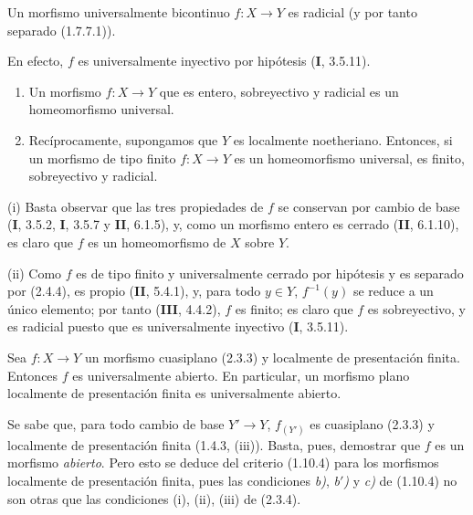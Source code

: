 \begin{proposition}[2.4.4]
\label{IV.2.4.4-fr}
Un morfismo universalmente bicontinuo $f:X\to Y$ es radicial (y por tanto
separado \textup{(1.7.7.1)}).
\end{proposition}

En efecto, $f$ es universalmente inyectivo por hipótesis (\textbf I, 3.5.11).

\begin{proposition}[2.4.5]
\begin{enumerate}
\item[\textup{(i)}] Un morfismo $f:X\to Y$ que es entero, sobreyectivo y radicial es un
homeomorfismo universal.
\item[\textup{(ii)}] Recíprocamente, supongamos que $Y$ es localmente noetheriano.
Entonces, si un morfismo de tipo finito $f:X\to Y$ es un homeomorfismo
universal, es finito, sobreyectivo y radicial.
\end{enumerate}
\end{proposition}

(i) Basta observar que las tres propiedades de $f$ se conservan por cambio de
base (\textbf I, 3.5.2, \textbf{I}, 3.5.7 y \textbf{II}, 6.1.5), y, como un morfismo entero es cerrado
(\textbf{II}, 6.1.10), es claro que $f$ es un homeomorfismo de $X$ sobre $Y$.

(ii) Como $f$ es de tipo finito y universalmente cerrado por hipótesis y es
separado por (2.4.4), es propio (\textbf{II}, 5.4.1), y, para todo $y\in Y$,
$f^{-1}(y)$ se reduce a un único elemento; por tanto (\textbf{III}, 4.4.2), $f$ es
finito; es claro que $f$ es sobreyectivo, y es radicial puesto que es
universalmente inyectivo (\textbf I, 3.5.11).

\begin{theorem}[2.4.6]
\label{IV.2.4.6-fr}
Sea $f:X\to Y$ un morfismo cuasiplano \textup{(2.3.3)} y localmente de presentación
finita. Entonces $f$ es universalmente abierto. En particular, un morfismo
plano localmente de presentación finita es universalmente abierto.
\end{theorem}

Se sabe que, para todo cambio de base $Y'\to Y$, $f_{(Y')}$ es cuasiplano
(2.3.3) y localmente de presentación finita (1.4.3, (iii)). Basta, pues,
demostrar que $f$ es un
morfismo \emph{abierto}. Pero esto se deduce del criterio (1.10.4) para los morfismos
localmente de presentación finita, pues las condiciones \emph{b)},
\emph{b$'$)} y \emph{c)} de (1.10.4) no son otras que las condiciones (i),
(ii), (iii) de (2.3.4).

